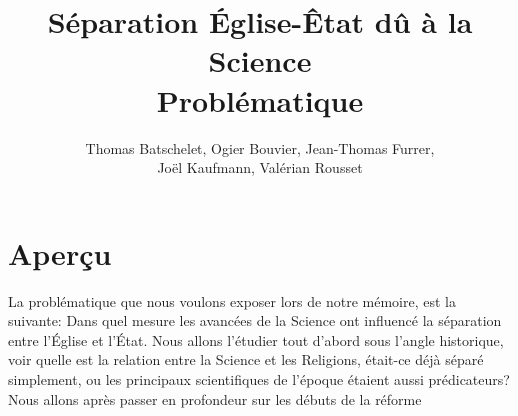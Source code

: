 \documentclass{article}
\title{S\'eparation \'Eglise-\^Etat d\^u \`a la Science \\
	\large{Probl\'ematique}}
\author{Thomas Batschelet, Ogier Bouvier, Jean-Thomas Furrer, \\ Jo\"el Kaufmann, Val\'erian Rousset}
\begin{document}
\maketitle

\section{Aperçu}

La probl\'ematique que nous voulons exposer lors de notre m\'emoire, est la
suivante: Dans quel mesure les avanc\'ees de la Science ont influenc\'e la s\'eparation
entre l'\'Eglise et l'\'Etat. Nous allons l'\'etudier tout d'abord sous l'angle
historique, voir quelle est la relation entre la Science et les Religions,
\'etait-ce d\'ej\`a s\'epar\'e simplement, ou les principaux scientifiques de l'\'epoque
\'etaient aussi pr\'edicateurs? Nous allons apr\`es passer en profondeur sur les
d\'ebuts de la r\'eforme
\end{document}
